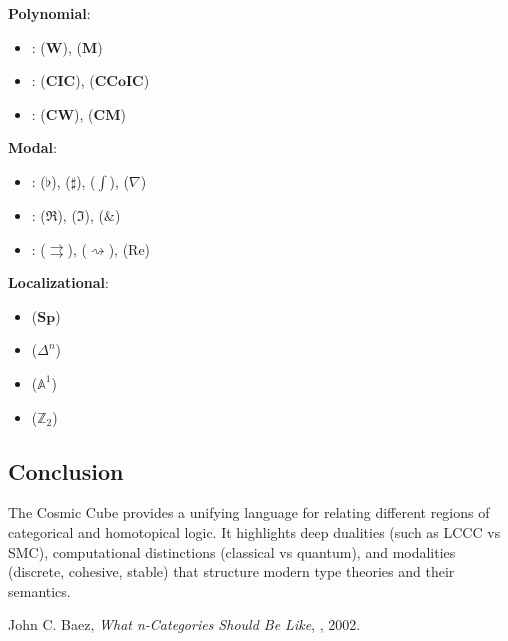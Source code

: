 \documentclass{article}
\begin{document}
\noindent \textbf{Polynomial}:
\begin{itemize}
\item {}:  ($\mathbf{W}$),  ($\mathbf{M}$)
\item {}:  ($\mathbf{CIC}$),  ($\mathbf{CCoIC}$)
\item {}:  ($\mathbf{CW}$),  ($\mathbf{CM}$)
\end{itemize}

\noindent \textbf{Modal}:
\begin{itemize}
\item {}:  ($\flat$),  ($\sharp$),  ($\int$),  ($\nabla$)
\item {}:  ($\Re$),  ($\Im$),  ($\&$)
\item {}:  ($\rightrightarrows$),  ($\rightsquigarrow$),  (Re)
\end{itemize}

\noindent \textbf{Localizational}:
\begin{itemize}
\item {} ($\mathbf{Sp}$)
\item {} ($\mathbb{\Delta}^n$)
\item {} ($\mathbb{A}^1$)
\item {} ($\mathbb{Z}_2$)
\end{itemize}

\subsection{Conclusion}
The Cosmic Cube provides a unifying language for relating different regions
of categorical and homotopical logic. It highlights deep dualities (such as
LCCC vs SMC), computational distinctions (classical vs quantum),
and modalities (discrete, cohesive, stable) that structure modern
type theories and their semantics.

\begin{thebibliography}{9}
 John C. Baez, \emph{What n-Categories Should Be Like}, , 2002.
\end{thebibliography}
\end{document}

